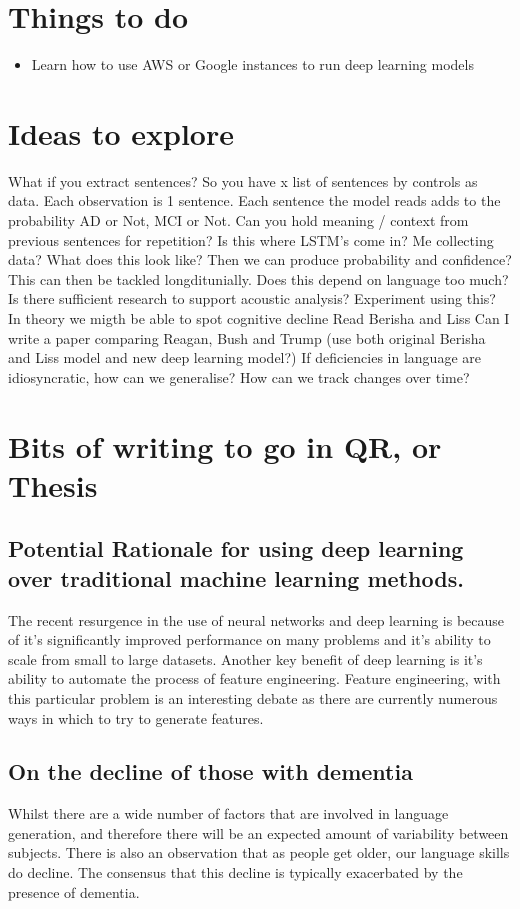 \documentclass[a4paper]{book}
\begin{document}
\section {Things to do}
\begin {itemize}
    \item Learn how to use AWS or Google instances to run deep learning models
\end {itemize}
\section {Ideas to explore}
What if you extract sentences? So you have x list of sentences by controls as data. Each observation is 1 sentence. Each sentence the model reads adds to the probability AD or Not, MCI or Not. \newline
Can you hold meaning / context from previous sentences for repetition? Is this where LSTM's come in? \newline
Me collecting data? What does this look like? Then we can produce probability and confidence? This can then be tackled longditunially. \newline
Does this depend on language too much? Is there sufficient research to support acoustic analysis?
Experiment using this? In theory we migth be able to spot cognitive decline \newline
Read Berisha and Liss \newline
Can I write a paper comparing Reagan, Bush and Trump (use both original Berisha and Liss model and new deep learning model?)
If deficiencies in language are idiosyncratic, how can we generalise? How can we track changes over time?


\section {Bits of writing to go in QR, or Thesis}
\subsection {Potential Rationale for using deep learning over traditional machine learning methods.}
The recent resurgence in the use of neural networks and deep learning is because of it's significantly improved performance on many problems and it's ability to scale from small to large datasets. Another key benefit of deep learning is it's ability to automate the process of feature engineering. Feature engineering, with this particular problem is an interesting debate as there are currently numerous ways in which to try to generate features.

\subsection {On the decline of those with dementia} Whilst there are a wide number of factors that are involved in language generation, and therefore there will be an expected amount of variability between subjects. There is also an observation that as people get older, our language skills do decline. The consensus that this decline is typically exacerbated by the presence of dementia. 
\end{document}
